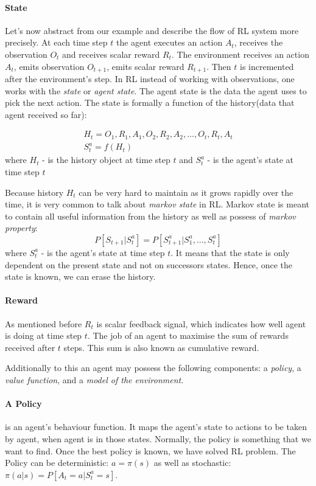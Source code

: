 \paragraph{State} \label{sec:comp_rl}
Let's now abstract from our example and describe the flow of RL system more precisely.
At each time step $t$ the agent executes an action $A_t$, receives the observation $O_t$
and receives scalar reward $R_t$. The environment receives an action $A_t$,
emits observation $O_{t+1}$, emits scalar reward $R_{t+1}$. Then $t$ is incremented
after the environment's step. In RL instead of working with observations, one works
with the \emph{state} or \emph{agent state}. The agent state is the data the agent uses
to pick the next action. The state is formally a function of the
history(data that agent received so far):

\begin{align} \label{eq:rl_state}
	H_t = O_1, R_1, A_1, O_2, R_2, A_2, ..., O_t, R_t, A_t \\
	S_t^a = f(H_t)
\end{align}
where $H_t$ - is the history object at time step $t$ and
$S_t^a$ - is the agent's state at time step $t$

Because history $H_t$ can be very hard to maintain as it grows rapidly over the time,
it is very common to talk about \emph{markov state} in RL. Markov state is meant
to contain all useful information from the history as well as possess of \emph{markov property}:
\begin{equation} \label{eq:markov_property}
	P[S_{t+1} | S_t^a] = P[S_{t+1}^a | S_1^a, ..., S_t^a]
\end{equation}
where $S_t^a$ - is the agent's state at time step $t$.
It means that the state is only dependent on the present state and not on
successors states. Hence, once the state is known, we can erase the history.

\paragraph{Reward} As mentioned before $R_t$ is scalar feedback signal, which
indicates how well agent is doing at time step $t$. The job of an agent to
maximise the sum of rewards received after $t$ steps. This sum is also known as
cumulative reward.

Additionally to this an agent may possess the following components:
a \emph{policy},
a \emph{value function}, and
a \emph{model of the environment}.

\paragraph{A Policy} is an agent's behaviour function. It maps the agent's state
to actions to be taken by agent, when agent is in those states. Normally, the policy is
something that we want to find. Once the best policy is known, we have solved RL problem.
The Policy can be deterministic: $a = \pi (s)$
as well as stochastic: $\pi(a|s) = P[A_t = a|S_t^a = s]$.

